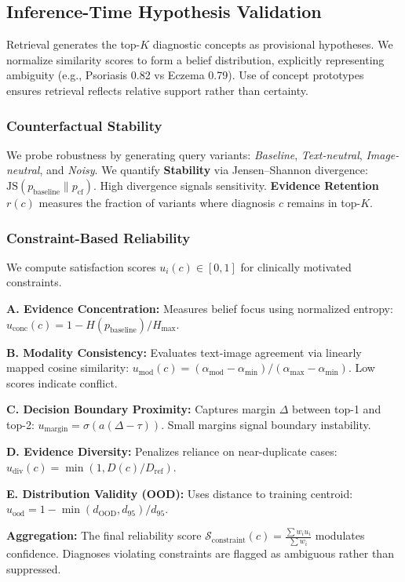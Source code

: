 \documentclass[conference]{IEEEtran}
\begin{document}
\subsection{Inference-Time Hypothesis Validation}
Retrieval generates the top-$K$ diagnostic concepts as provisional hypotheses. We normalize similarity scores to form a belief distribution, explicitly representing ambiguity (e.g., Psoriasis 0.82 vs Eczema 0.79). Use of concept prototypes ensures retrieval reflects relative support rather than certainty.

\subsubsection{Counterfactual Stability}
We probe robustness by generating query variants: \textit{Baseline}, \textit{Text-neutral}, \textit{Image-neutral}, and \textit{Noisy}.
We quantify \textbf{Stability} via Jensen–Shannon divergence: $\mathrm{JS}(p_{\text{baseline}} \| p_{\text{cf}})$.
High divergence signals sensitivity. \textbf{Evidence Retention} $r(c)$ measures the fraction of variants where diagnosis $c$ remains in top-$K$.

\subsubsection{Constraint-Based Reliability}
We compute satisfaction scores $u_i(c) \in [0,1]$ for clinically motivated constraints.

\textbf{A. Evidence Concentration:} Measures belief focus using normalized entropy:
$u_{\text{conc}}(c) = 1 - {H(p_{\text{baseline}})}/{H_{\max}}$.

\textbf{B. Modality Consistency:} Evaluates text-image agreement via linearly mapped cosine similarity:
$u_{\text{mod}}(c) = (\alpha_{\text{mod}} - \alpha_{\min})/(\alpha_{\max} - \alpha_{\min})$. Low scores indicate conflict.

\textbf{C. Decision Boundary Proximity:} Captures margin $\Delta$ between top-1 and top-2:
$u_{\text{margin}} = \sigma(a(\Delta - \tau))$. Small margins signal boundary instability.

\textbf{D. Evidence Diversity:} Penalizes reliance on near-duplicate cases:
$u_{\text{div}}(c) = \min(1, {D(c)}/{D_{\text{ref}}})$.

\textbf{E. Distribution Validity (OOD):} Uses distance to training centroid:
$u_{\text{ood}} = 1 - {\min(d_{\text{OOD}}, d_{95})}/{d_{95}}$.

\textbf{Aggregation:} The final reliability score $\mathcal{S}_{\text{constraint}}(c) = \frac{\sum w_i u_i}{\sum w_i}$ modulates confidence. Diagnoses violating constraints are flagged as ambiguous rather than suppressed.
\end{document}
